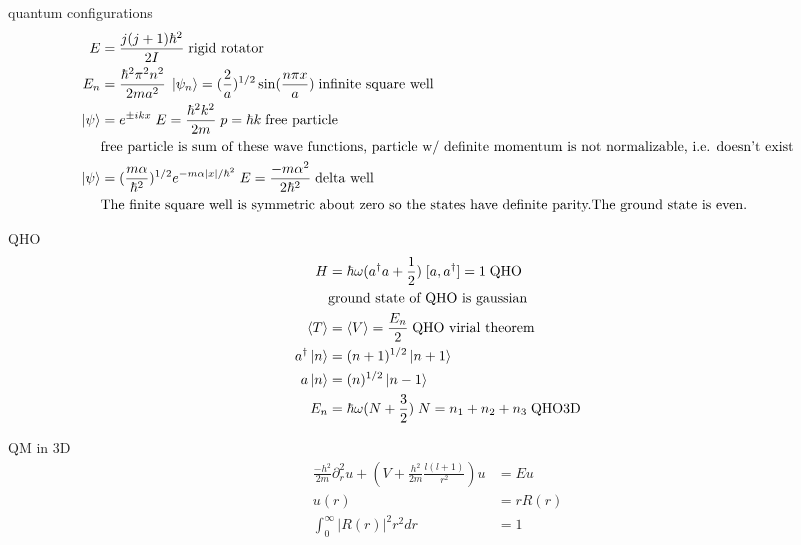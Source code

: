 \documentclass[avery5388, frame, grid]{flashcards}
\begin{document}
\begin{flashcard}{quantum configurations}
  {
    \begin{align*}
      E &= \frac{j(j + 1)\hbar^{2}}{2 I} \; \textrm{rigid rotator}\\
      E_{n} &= \frac{\hbar^{2} \pi^{2} n^{2}}{2 m a^{2}} \; \ket{\psi_{n}} = (\frac{2}{a})^{1/2} \sin(\frac{n \pi x}{a}) \; \textrm{infinite square well}\\
      \ket{\psi} &= e^{\pm i k x} \; E = \frac{\hbar^{2} k^{2}}{2 m} \; p = \hbar k \; \textrm{free particle}\\
      &\textrm{free particle is sum of these wave functions, particle w/ definite momentum is not normalizable, i.e. doesn't exist}\\
      \ket{\psi} &= (\frac{m \alpha}{\hbar^{2}})^{1/2} e^{-m \alpha \lvert x \rvert / \hbar^{2}} \; E = \frac{-m \alpha^{2}}{2 \hbar^{2}} \; \textrm{delta well}\\
      &\textrm{The finite square well is symmetric about zero so the states have definite parity.The ground state is even.}\\
    \end{align*}
  }
\end{flashcard}

\begin{flashcard}{QHO}
  {
    \begin{align*}
      H &= \hbar \omega (a^{\dagger}a + \frac{1}{2}) \; [a, a^{\dagger}] = 1 \; \textrm{QHO}\\
      &\textrm{ground state of QHO is gaussian}\\
      \langle T \rangle &= \langle V \rangle = \frac{E_{n}}{2} \; \textrm{QHO virial theorem}\\
      a^{\dagger} \ket{n} &= (n + 1)^{1/2} \ket{n + 1}\\
      a \ket{n} &= (n)^{1/2} \ket{n - 1}\\
      E_{n} &= \hbar \omega (N + \frac{3}{2}) \; N = n_{1} + n_{2} + n_{3} \; \textrm{QHO3D}
    \end{align*}
  }
\end{flashcard}

\begin{flashcard}{QM in 3D}
  {
    \begin{align*}
      \frac{-h^{2}}{2m} \partial_{r}^{2} u + (V + \frac{h^{2}}{2m} \frac{l(l+1)}{r^{2}}) u &= E u\\
      u(r) &= r R(r)\\
      \int_{0}^{\infty} {\lvert R(r) \rvert}^{2} r^{2} dr &= 1
    \end{align*}
  }
\end{flashcard}
\end{document}
